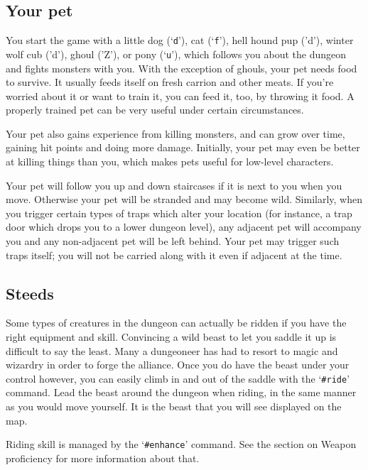 \subsection*{Your pet}


You start the game with a little dog (`{\tt d}'), cat (`{\tt f}'), hell hound pup ('d'),
winter wolf cub ('d'), ghoul ('Z'), or pony (`{\tt u}'), which follows you about
the dungeon and fights monsters with you.  With the exception of ghouls, your
pet needs food to survive.  It usually feeds itself on fresh carrion
and other meats.  If you're worried about it or want to train it, you
can feed it, too, by throwing it food.  A properly trained pet can be
very useful under certain circumstances.

Your pet also gains experience from killing monsters, and can grow
over time, gaining hit points and doing more damage.  Initially, your
pet may even be better at killing things than you, which makes pets
useful for low-level characters.

Your pet will follow you up and down staircases if it is next to you
when you move.  Otherwise your pet will be stranded and may become
wild.  Similarly, when you trigger certain types of traps which alter
your location (for instance, a trap door which drops you to a lower
dungeon level), any adjacent pet will accompany you and any non-adjacent
pet will be left behind.  Your pet may trigger such traps itself; you
will not be carried along with it even if adjacent at the time.
\subsection*{Steeds}


Some types of creatures in the dungeon can actually be ridden if you
have the right equipment and skill.  Convincing a wild beast to let
you saddle it up is difficult to say the least.  Many a dungeoneer 
has had to resort to magic and wizardry in order to forge the alliance.
Once you do have the beast under your control however, you can 
easily climb in and out of the saddle with the `{\tt \#ride}' command.  Lead
the beast around the dungeon when riding, in the same manner as 
you would move yourself.  It is the beast that you will see displayed
on the map.

Riding skill is managed by the `{\tt \#enhance}' command.  See the section
on Weapon proficiency for more information about that.

